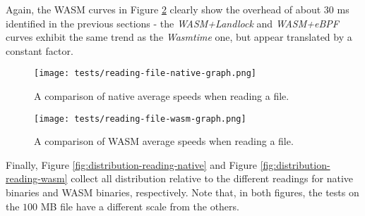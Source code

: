 Again, the WASM curves in Figure \ref{fig:avg-comparison-wasm-speed} clearly show the overhead
of about $30$ ms identified in the previous sections - the \textit{WASM+Landlock} and \textit{WASM+eBPF} curves
exhibit the same trend as the \textit{Wasmtime} one, but appear translated by a constant factor.

\begin{figure}[ht!]
  \centering
  \texttt{[image: tests/reading-file-native-graph.png]}
  \caption{A comparison of native average speeds when reading a file.}
  \label{fig:avg-comparison-native-speed}
\end{figure}

\begin{figure}[ht!]
  \centering
  \texttt{[image: tests/reading-file-wasm-graph.png]}
  \caption{A comparison of WASM average speeds when reading a file.}
  \label{fig:avg-comparison-wasm-speed}
\end{figure}

\clearpage
Finally, Figure \ref{fig:distribution-reading-native} and Figure \ref{fig:distribution-reading-wasm}
collect all distribution relative to the different readings for native binaries and WASM binaries, respectively.
Note that, in both figures, the tests on the $100$ MB file have a different scale from the others.

